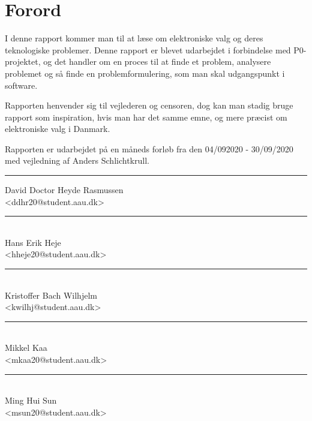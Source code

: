 \section*{Forord}%
I denne rapport kommer man til at læse om elektroniske valg og deres teknologiske problemer. Denne rapport er blevet udarbejdet i forbindelse med P0-projektet, og det handler om en proces til at finde et problem, analysere problemet og så finde en problemformulering, som man skal udgangspunkt i software. 

Rapporten henvender sig til vejlederen og censoren, dog kan man stadig bruge rapport som inspiration, hvis man har det samme emne, og mere præcist om elektroniske valg i Danmark. 

Rapporten er udarbejdet på en måneds forløb fra den 04/092020 - 30/09/2020 med vejledning af Anders Schlichtkrull.

\vfill\noindent

\begin{center}
\begin{minipage}[b]{0.45\textwidth}
 \centering
 \rule{\textwidth}{0.5pt}
  David Doctor Heyde Rasmussen\\
 {\footnotesize <ddhr20@student.aau.dk>}
\end{minipage}
\end{center}

\begin{center}
\begin{minipage}[b]{0.45\textwidth}
 \centering
 \rule{\textwidth}{0.5pt}\\
  Hans Erik Heje\\
 {\footnotesize <hheje20@student.aau.dk>}
\end{minipage}
\hfill
\begin{minipage}[b]{0.45\textwidth}
 \centering
 \rule{\textwidth}{0.5pt}\\
  Kristoffer Bach Wilhjelm\\
 {\footnotesize <kwilhj@student.aau.dk>}
\end{minipage}
\vspace{3\baselineskip}
\end{center}

\begin{center}
\begin{minipage}[b]{0.45\textwidth}
 \centering
 \rule{\textwidth}{0.5pt}\\
  Mikkel Kaa\\
 {\footnotesize <mkaa20@student.aau.dk>}
\end{minipage}
\hfill
\begin{minipage}[b]{0.45\textwidth}
 \centering
 \rule{\textwidth}{0.5pt}\\
  Ming Hui Sun\\
 {\footnotesize <msun20@student.aau.dk>}
\end{minipage}
\end{center}
